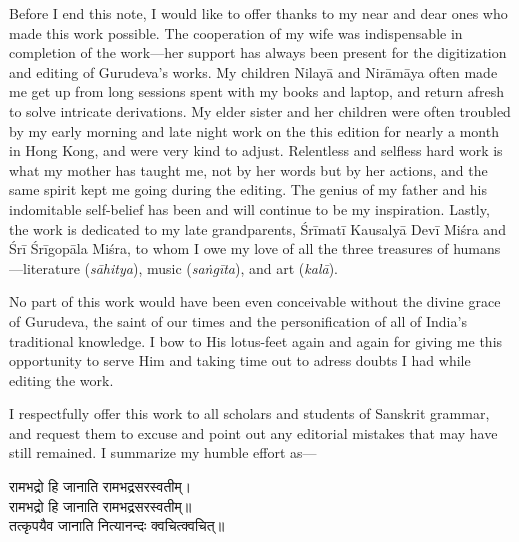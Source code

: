 \begin{sloppypar}\justifying\noindent\hspace{10mm} {\engtextfont Before I end this note, I would like to offer thanks to my near and dear ones who made this work possible. The cooperation of my wife was indispensable in completion of the work—her support has always been present for the digitization and editing of Gurudeva’s works. My children Nilayā and Nirāmāya often made me get up from long sessions spent with my books and laptop, and return afresh to solve intricate derivations. My elder sister and her children were often troubled by my early morning and late night work on the this edition for nearly a month in Hong Kong, and were very kind to adjust. Relentless and selfless hard work is what my mother has taught me, not by her words but by her actions, and the same spirit kept me going during the editing. The genius of my father and his indomitable self-belief has been and will continue to be my inspiration. Lastly, the work is dedicated to my late grandparents, Śrīmatī Kausalyā Devī Miśra and Śrī Śrīgopāla Miśra, to whom I owe my love of all the three treasures of humans—literature (\textit{sāhitya}), music (\textit{saṅgīta}), and art (\textit{kalā}).}\end{sloppypar}
\begin{sloppypar}\justifying\noindent\hspace{10mm} {\engtextfont No part of this work would have been even conceivable without the divine grace of Gurudeva, the saint of our times and the personification of all of India’s traditional knowledge. I bow to His lotus-feet again and again for giving me this opportunity to serve Him and taking time out to adress doubts I had while editing the work.}\end{sloppypar}
\begin{sloppypar}\justifying\noindent\hspace{10mm} {\engtextfont I respectfully offer this work to all scholars and students of Sanskrit grammar, and request them to excuse and point out any editorial mistakes that may have still remained. I summarize my humble effort as—}\end{sloppypar}
\vspace{-2mm}
\begin{center}
रामभद्रो हि जानाति रामभद्रसरस्वतीम्।\nopagebreak\\
रामभद्रो हि जानाति रामभद्रसरस्वतीम्॥\nopagebreak\\
तत्कृपयैव जानाति नित्यानन्दः क्वचित्क्वचित्॥\nopagebreak\\
\end{center}
